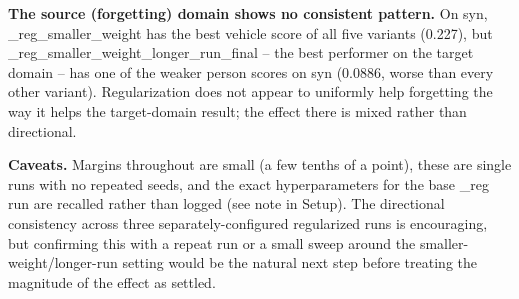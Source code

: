 \documentclass[11pt]{article}
\begin{document}
\textbf{The source (forgetting) domain shows no consistent pattern.} On syn,
\_reg\_smaller\_weight has the best vehicle score of all five variants (0.227), but
\_reg\_smaller\_weight\_longer\_run\_final -- the best performer on the target domain
-- has one of the weaker person scores on syn (0.0886, worse than every other
variant). Regularization does not appear to uniformly help forgetting the way it
helps the target-domain result; the effect there is mixed rather than directional.

\textbf{Caveats.} Margins throughout are small (a few tenths of a point), these are
single runs with no repeated seeds, and the exact hyperparameters for the base \_reg
run are recalled rather than logged (see note in Setup). The directional consistency
across three separately-configured regularized runs is encouraging, but confirming
this with a repeat run or a small sweep around the smaller-weight/longer-run setting
would be the natural next step before treating the magnitude of the effect as settled.
\end{document}
